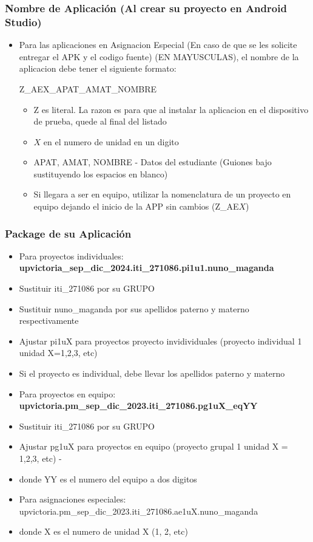 \begin{frame}
\frametitle{Nombre de Aplicaci\'on (Al crear su proyecto en Android Studio)}
\begin{itemize}
\item Para las aplicaciones en Asignacion Especial (En caso de que se les solicite entregar el APK y el codigo fuente) (EN MAYUSCULAS), el nombre de la aplicacion debe tener el siguiente formato:

Z\_AEX\_APAT\_AMAT\_NOMBRE

\begin{itemize}

\item Z es literal. La razon es para que al instalar la aplicacion en el dispositivo de prueba, quede al final del listado
\item $X$ en el numero de unidad en un digito
\item APAT, AMAT, NOMBRE - Datos del estudiante (Guiones bajo sustituyendo los espacios en blanco)
\item Si llegara a ser en equipo, utilizar la nomenclatura de un proyecto en equipo dejando el inicio de la APP sin cambios (Z\_AE$X$)
\end{itemize}
\end{itemize}

\end{frame}

\begin{frame}
\frametitle{Package de su Aplicaci\'on}
\begin{itemize}
\item Para proyectos individuales: \textbf{upvictoria\_sep\_dic\_2024.iti\_271086.pi1u1.nuno\_maganda}
\item Sustituir iti\_271086 por su GRUPO
\item Sustituir nuno\_maganda por sus apellidos paterno y materno respectivamente
\item Ajustar pi1uX para proyectos proyecto invidividuales (proyecto individual 1 unidad X=1,2,3, etc)
\item Si el proyecto es individual, debe llevar los apellidos paterno y materno
\item Para proyectos en equipo: \textbf{upvictoria.pm\_sep\_dic\_2023.iti\_271086.pg1uX\_eqYY}
\item Sustituir iti\_271086 por su GRUPO
\item Ajustar pg1uX para proyectos en equipo (proyecto grupal 1 unidad X = 1,2,3, etc) -
\item donde YY es el numero del equipo a dos digitos
\item Para asignaciones especiales: upvictoria.pm\_sep\_dic\_2023.iti\_271086.ae1uX.nuno\_maganda
\item  donde X es el numero de unidad X (1, 2, etc) 
\end{itemize}

\end{frame}
